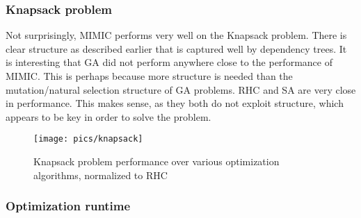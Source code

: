 \documentclass[12pt]{article}
\begin{document}
\subsubsection{Knapsack problem}

Not surprisingly, MIMIC performs very well on the Knapsack problem. There is clear structure as described earlier that is captured well by dependency trees. It is interesting that GA did not perform anywhere close to the performance of MIMIC. This is perhaps because more structure is needed than the mutation/natural selection structure of GA problems. RHC and SA are very close in performance. This makes sense, as they both do not exploit structure, which appears to be key in order to solve the problem.

\begin{figure}[h!]
    \texttt{[image: pics/knapsack]}
    \caption{Knapsack problem performance over various optimization algorithms, normalized to RHC}
\end{figure}



\subsubsection{Optimization runtime}
\end{document}
